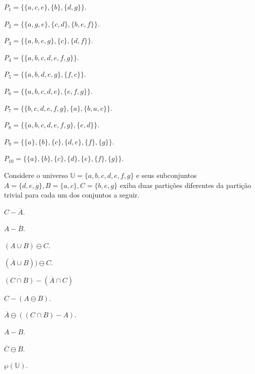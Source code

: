 \begin{exerList}
	\item $P_1 = \{\{a, c, e\}, \{b\}, \{d, g\}\}$.
	\item $P_2 = \{\{a, g, e\}, \{c, d\}, \{b, e, f\}\}$.
	\item $P_3 = \{\{a, b, e, g\}, \{c\}, \{d, f\}\}$.
	\item $P_4 = \{\{a, b, c, d, e, f, g\}\}$.
	\item $P_5 = \{\{a, b, d, e, g\}, \{f, c\}\}$.
	\item $P_6 = \{\{a, b, c, d, e\}, \{e, f, g\}\}$.
	\item $P_7 = \{\{b, c, d, e, f, g\}, \{a\}, \{b, a,c\}\}$.
	\item $P_8 = \{\{a, b, c, d, e, f, g\}, \{e, d\}\}$.
	\item $P_9 = \{\{a\}, \{b\}, \{c\}, \{d,e\}, \{f\}, \{g\}\}$.
	\item $P_{10} = \{\{a\}, \{b\}, \{c\}, \{d\}, \{e\}, \{f\}, \{g\}\}$.
\end{exerList}

\begin{problem}\label{prob:Conjuntos17}
	Considere o universo $\mathbb{U} = \{a, b, c, d, e, f, g\}$ e seus subconjuntos $A = \{d, e, g\}, B = \{a, c\}, C =\{b, e, g\}$ exiba duas partições diferentes da partição trivial para cada um dos conjuntos a seguir. 
\end{problem}

\begin{exerList}
	\item $C - \overline{A}$.
	\item $A - \overline{B}$.
	\item $(A \cup B) \ominus C$.
	\item $(\overline{A} \cup B)) \ominus C$.
	\item $\overline{(C \cap B)} - (\overline{A} \cap C)$
	\item $C - (A \ominus B)$.
	\item $\overline{A} \ominus ((C \cap B)  - A)$.
	\item $A - B$.
	\item $\overline{C} \ominus B$.
	\item $\wp(\mathbb{U})$.
\end{exerList}